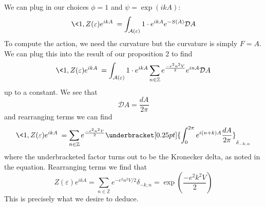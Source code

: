 We can plug in our choices $\phi=1$ and $\psi=\exp(ikA)$:
\begin{equation}%
\<1,Z(\varepsilon)e^{ikA}\> = \int_{\mathcal{A}(\varepsilon)}1\cdot e^{ikA}e^{-S(A)}\mathcal{D}A
\end{equation}
To compute the action, we need the curvature but the curvature is
simply $F=A$. We can plug this into the result of our proposition
2 to find
\begin{equation}%
\<1,Z(\varepsilon)e^{ikA}\> = \int_{\mathcal{A}(\varepsilon)}1\cdot e^{ikA}\sum_{n\in\mathbb{Z}}e^{\frac{-e^{2}n^{2}V}{2}}e^{inA}\mathcal{D}A
\end{equation}
up to a constant. We see that
\begin{equation}%
\mathcal{D}A = \frac{dA}{2\pi}
\end{equation}
and rearranging terms we can find
\begin{equation}%
\<1,Z(\varepsilon)e^{ikA}\> = \sum_{n\in\mathbb{Z}}e^{\frac{-e^{2}n^{2}V}{2}}\underbracket[0.25pt]{\int^{2\pi}_{0}e^{i(n+k)A}\frac{dA}{2\pi}}_{\delta_{-k,n}}
\end{equation}
where the underbracketed factor turns out to be the Kronecker
delta, as noted in the equation. Rearranging terms we find that
\begin{equation}%
Z(\varepsilon)e^{ikA} =
\sum_{n\in\mathbb{Z}}e^{-e^{2}n^{2}V/2}\delta_{-k,n} = \exp\left(\frac{-e^{2}k^{2}V}{2}\right)
\end{equation}
This is precisely what we desire to deduce.
